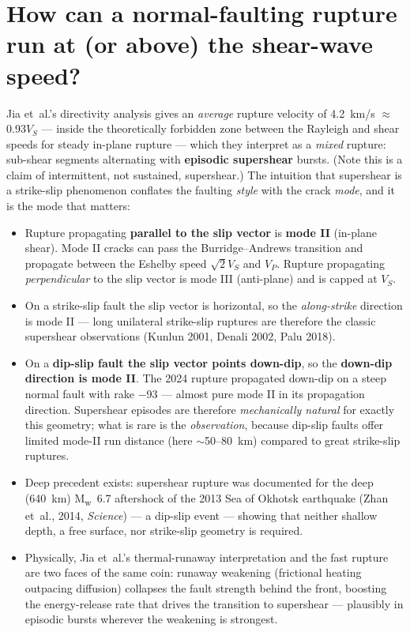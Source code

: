 \documentclass[11pt]{article}
\newcommand{\Mw}{M\textsubscript{w}}
\begin{document}
\section{How can a normal-faulting rupture run at (or above) the shear-wave speed?}
\label{sec:supershear}
Jia et~al.'s directivity analysis gives an \emph{average} rupture velocity of 4.2~km/s
$\approx$ 0.93$V_S$ --- inside the theoretically forbidden zone between the Rayleigh and
shear speeds for steady in-plane rupture --- which they interpret as a \emph{mixed} rupture:
sub-shear segments alternating with \textbf{episodic supershear} bursts. (Note this is a
claim of intermittent, not sustained, supershear.) The intuition that supershear is a
strike-slip phenomenon conflates the faulting \emph{style} with the crack \emph{mode}, and it
is the mode that matters:
\begin{itemize}
\item Rupture propagating \textbf{parallel to the slip vector} is \textbf{mode II} (in-plane
  shear). Mode II cracks can pass the Burridge--Andrews transition and propagate between the
  Eshelby speed $\sqrt{2}V_S$ and $V_P$. Rupture propagating \emph{perpendicular} to the slip
  vector is mode III (anti-plane) and is capped at $V_S$.
\item On a strike-slip fault the slip vector is horizontal, so the \emph{along-strike}
  direction is mode II --- long unilateral strike-slip ruptures are therefore the classic
  supershear observations (Kunlun 2001, Denali 2002, Palu 2018).
\item On a \textbf{dip-slip fault the slip vector points down-dip}, so the \textbf{down-dip
  direction is mode II}. The 2024 rupture propagated down-dip on a steep normal fault with
  rake $-$93 --- almost pure mode II in its propagation direction. Supershear episodes are
  therefore \emph{mechanically natural} for exactly this geometry; what is rare is the
  \emph{observation}, because dip-slip faults offer limited mode-II run distance (here
  $\sim$50--80~km) compared to great strike-slip ruptures.
\item Deep precedent exists: supershear rupture was documented for the deep (640~km)
  \Mw~6.7 aftershock of the 2013 Sea of Okhotsk earthquake (Zhan et~al., 2014, \emph{Science})
  --- a dip-slip event --- showing that neither shallow depth, a free surface, nor
  strike-slip geometry is required.
\item Physically, Jia et~al.'s thermal-runaway interpretation and the fast rupture are two
  faces of the same coin: runaway weakening (frictional heating outpacing diffusion) collapses
  the fault strength behind the front, boosting the energy-release rate that drives the
  transition to supershear --- plausibly in episodic bursts wherever the weakening is
  strongest.
\end{itemize}
\end{document}
